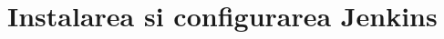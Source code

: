 \begin{comment}

\paragraph{!!! ATENTIE !!!} 
Accesul la acest cont/server este shared (e folosit
inclusiv de catre Jenkins), 
pot aparea suprapuneri nedorite intre variante diferite / dezvoltatori diferiti !!!

Se adauga in view-ul 'Servers' un nou server remote: click-dreapta -> 'New'
-> 'Server' -> vendor 'VMware' -> tip 'Cloud Foundry' -> 'Next'.

Se completeaza wizard-ul conform urmatorilor pasi:
\begin{itemize}
  \item 
Email: roda.devel@gmail.com
  \item 
Parola: RodaAdor
  \item 
'Validate Account'
  \item 
'Next'
  \item 
Se muta proiectul 'roda' din lista 'Available' in lista 'Configured'
  \item 
'Next'
  \item 
In fereastra 'Application details', se selecteaza 'Application Type' = 'Spring'
  \item 
'Next'
  \item 
'Deployed URL': roda.cloudfoundry.com
  \item 
'Memory Reservation': 2048 M
  \item 
'Next'
  \item 
Se bifeaza serviciul 'roda-postgres' (baza de date Postgresql) in lista
aparuta.
  \item 
'Finish'
\end{itemize}

Proiectul este disponibil online permanent la adresa:

\url{http://roda.cloudfoundry.com}

\end{comment}

\section{Instalarea si configurarea Jenkins}

